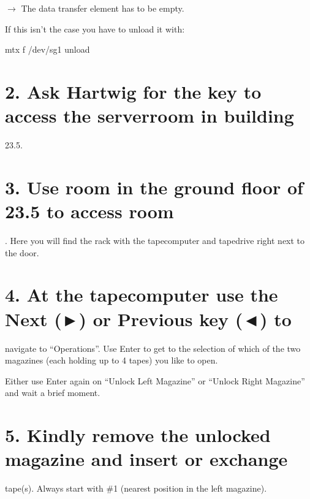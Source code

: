 \documentclass[letterpaper,10pt,english]{sphinxmanual}
\begin{document}
\(\rightarrow\) The data transfer element has to be
empty.


If this isn’t the case you have to unload it with:

\begin{sphinxVerbatim}[commandchars=\\\{\}]
mtx \PYGZhy{}f /dev/sg1 unload
\end{sphinxVerbatim}


\section{2. Ask Hartwig for the key to access the server\sphinxhyphen{}room in building}
\label{\detokenize{extract_tapes:ask-hartwig-for-the-key-to-access-the-server-room-in-building}}
23.5.


\section{3. Use room  in the ground floor of 23.5 to access room}
\label{\detokenize{extract_tapes:use-room-0-03-in-the-ground-floor-of-23-5-to-access-room}}
. Here you will find the rack with the tape\sphinxhyphen{}computer and
tape\sphinxhyphen{}drive right next to the door.


\section{4. At the tape\sphinxhyphen{}computer use the Next (►) or Previous key (◄) to}
\label{\detokenize{extract_tapes:at-the-tape-computer-use-the-next-or-previous-key-to}}
navigate to “Operations”. Use Enter to get to the selection of which of
the two magazines (each holding up to 4 tapes) you like to open.


Either use Enter again on “Unlock Left Magazine” or “Unlock Right
Magazine” and wait a brief moment.


\section{5. Kindly remove the unlocked magazine and insert or exchange}
\label{\detokenize{extract_tapes:kindly-remove-the-unlocked-magazine-and-insert-or-exchange}}
tape(s). Always start with \#1 (nearest position in the left magazine).
\end{document}
